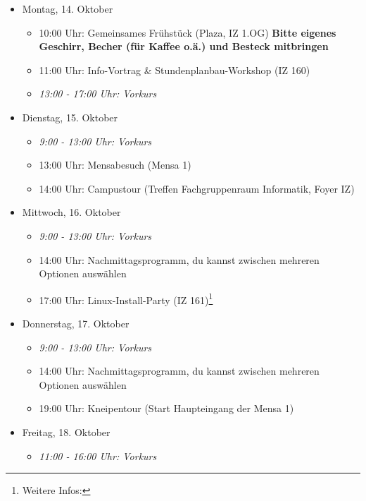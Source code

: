 \begin{itemize}
    \item Montag, 14. Oktober
        \begin{itemize}
            \item 10:00 Uhr: Gemeinsames Frühstück (Plaza, IZ 1.OG) \textbf{Bitte eigenes Geschirr, Becher (für Kaffee o.ä.) und Besteck mitbringen}
            \item 11:00 Uhr: Info-Vortrag \& Stundenplanbau-Workshop (IZ 160)
            \item \textit{13:00 - 17:00 Uhr: Vorkurs}
        \end{itemize}
    \item Dienstag, 15. Oktober
        \begin{itemize}
            \item \textit{9:00 - 13:00 Uhr: Vorkurs}
            \item 13:00 Uhr: Mensabesuch (Mensa 1)
            \item 14:00 Uhr: Campustour (Treffen Fachgruppenraum Informatik, Foyer IZ)
        \end{itemize}
    \item Mittwoch, 16. Oktober
        \begin{itemize}
            \item \textit{9:00 - 13:00 Uhr: Vorkurs}
            \item 14:00 Uhr: Nachmittagsprogramm, du kannst zwischen mehreren Optionen auswählen
            \item 17:00 Uhr: Linux-Install-Party (IZ 161)\footnote{Weitere Infos: }
        \end{itemize}
    \pagebreak
    \item Donnerstag,  17. Oktober
        \begin{itemize}
            \item \textit{9:00 - 13:00 Uhr: Vorkurs}
            \item 14:00 Uhr: Nachmittagsprogramm, du kannst zwischen mehreren Optionen auswählen
            \item 19:00 Uhr: Kneipentour (Start Haupteingang der Mensa 1)
        \end{itemize}
    \item Freitag, 18. Oktober
        \begin{itemize}
            \item \textit{11:00 - 16:00 Uhr: Vorkurs}
        \end{itemize}

\end{itemize}
